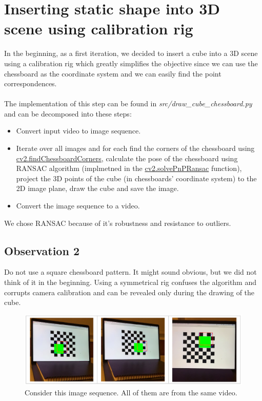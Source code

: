 \documentclass[paper=a4, fontsize=11pt]{scrartcl}
\numberwithin{equation}{section}		%
\numberwithin{figure}{section}			%
\numberwithin{table}{section}				%
\begin{document}
\section*{Inserting static shape into 3D scene using calibration rig}
In the beginning, as a first iteration, we decided to insert a cube into a 3D scene using a calibration rig which greatly simplifies the objective since we can use the chessboard as the coordinate system and we can easily find the point correspondences.\\\\The implementation of this step can be found in \emph{src/draw\_cube\_chessboard.py} and can be decomposed into these steps:
\begin{itemize}
\item Convert input video to image sequence.
\item Iterate over all images and for each find the corners of the chessboard using \href{https://docs.opencv.org/2.4/modules/calib3d/doc/camera_calibration_and_3d_reconstruction.html#findchessboardcorners}{cv2.findChessboardCorners}, calculate the pose of the chessboard using RANSAC algorithm (implmetned in the \href{https://docs.opencv.org/2.4/modules/calib3d/doc/camera_calibration_and_3d_reconstruction.html?highlight=solvepnpransac#solvepnpransac}{cv2.solvePnPRansac} function), project the 3D points of the cube (in chessboards' coordinate system) to the 2D image plane, draw the cube and save the image.
\item Convert the image sequence to a video.
\end{itemize}
We chose RANSAC because of it's robustness and resistance to outliers.

\subsection*{Observation 2}
Do not use a square chessboard pattern. It might sound obvious, but we did not think of it in the beginning. Using a symmetrical rig confuses the algorithm and corrupts camera calibration and can be revealed only during the drawing of the cube.

\begin{figure}[h!]
\centering
\includegraphics[width=1\textwidth]{img/staticShape}
\caption{Consider this image sequence. All of them are from the same video.}
\end{figure}
\end{document}
